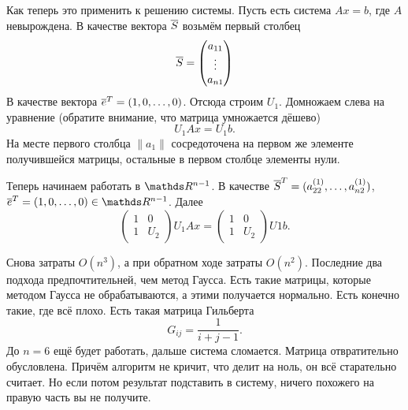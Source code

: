 Как теперь это применить к решению системы. Пусть есть система $Ax = b$, где $A$ невырождена. В качестве вектора $\overline{S}$ возьмём первый столбец
\[
  \overline{S} = \begin{pmatrix}
a_{11}\\
\vdots \\
a_{n1}
\end{pmatrix}
\]
В качестве вектора $\overline{e}^T = (1,0,\dots,0)$. Отсюда строим $U_1$. Домножаем слева на уравнение (обратите внимание, что матрица умножается дёшево)
\[
  U_1 A x = U_1 b.
\]
На месте первого столбца $\|a_1\|$ сосредоточена на первом же элементе получившейся матрицы, остальные в первом столбце элементы нули.

Теперь начинаем работать в $\R^{n-1}$. В качестве $\overline{S}^T = (a_{22}^{(1)},\dots, a_{n2}^{(1)})$, $\ol e^T =(1,0,\dots,0)\in \R^{n-1}$. Далее
\[
  \begin{pmatrix}
1 &0\\
1 & U_2
\end{pmatrix}U_1 A x = \begin{pmatrix}
1 &0\\
1 & U_2
\end{pmatrix} U1 b.
\]

Снова затраты $O(n^3)$, а при обратном ходе затраты $O(n^2)$. Последние два подхода предпочтительней, чем метод Гаусса. Есть такие матрицы, которые методом Гаусса не обрабатываются, а этими получается нормально. Есть конечно такие, где всё плохо. Есть такая матрица Гильберта
\[
  G_{ij} = \frac1{i+j-1}.
\]
До $n=6$ ещё будет работать, дальше система сломается. Матрица отвратительно обусловлена. Причём алгоритм не кричит, что делит на ноль, он всё старательно считает. Но если потом результат подставить в систему, ничего похожего на правую часть вы не получите.
